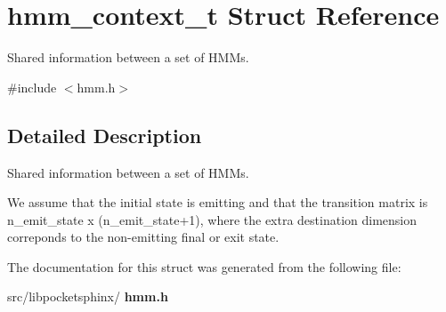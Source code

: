 \section{hmm\+\_\+context\+\_\+t Struct Reference}
\label{structhmm__context__t}


Shared information between a set of H\+M\+Ms.  




{\ttfamily \#include $<$hmm.\+h$>$}



\subsection{Detailed Description}
Shared information between a set of H\+M\+Ms. 

We assume that the initial state is emitting and that the transition matrix is n\+\_\+emit\+\_\+state x (n\+\_\+emit\+\_\+state+1), where the extra destination dimension correponds to the non-\/emitting final or exit state. 

The documentation for this struct was generated from the following file\+:\begin{DoxyCompactItemize}
\item 
src/libpocketsphinx/\textbf{ hmm.\+h}\end{DoxyCompactItemize}
